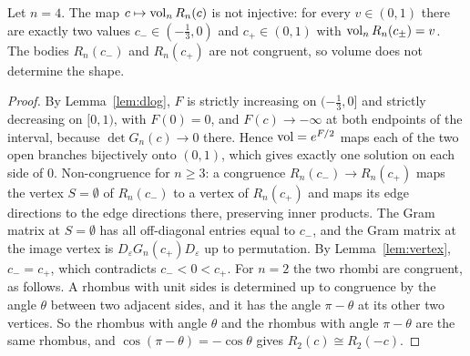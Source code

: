 \begin{theorem}\label{thm:main}
Let $n=4$. The map $c\mapsto\operatorname{vol}_nR_n(c)$ is not injective: for every $v\in(0,1)$ there are exactly two values $c_-\in(- \frac{1}{3},0)$ and $c_+\in(0,1)$ with $\operatorname{vol}_nR_n(c_\pm)=v$.
The bodies $R_n(c_-)$ and $R_n(c_+)$ are not congruent, so volume does not determine the shape.
\end{theorem}
\begin{proof}
By Lemma~\ref{lem:dlog}, $F$ is strictly increasing on $(- \frac{1}{3},0]$ and strictly decreasing on $[0,1)$, with $F(0)=0$, and $F(c)\to-\infty$ at both endpoints of the interval, because $\det G_n(c)\to0$ there.
Hence $\operatorname{vol}=e^{F/2}$ maps each of the two open branches bijectively onto $(0,1)$, which gives exactly one solution on each side of $0$.
Non-congruence for $n\ge3$: a congruence $R_n(c_-)\to R_n(c_+)$ maps the vertex $S=\emptyset$ of $R_n(c_-)$ to a vertex of $R_n(c_+)$ and maps its edge directions to the edge directions there, preserving inner products. The Gram matrix at $S=\emptyset$ has all off-diagonal entries equal to $c_-$, and the Gram matrix at the image vertex is $D_\varepsilon G_n(c_+)D_\varepsilon$ up to permutation. By Lemma~\ref{lem:vertex}, $c_-=c_+$, which contradicts $c_-<0<c_+$. For $n=2$ the two rhombi are congruent, as follows. A rhombus with unit sides is determined up to congruence by the angle $\theta$ between two adjacent sides, and it has the angle $\pi-\theta$ at its other two vertices. So the rhombus with angle $\theta$ and the rhombus with angle $\pi-\theta$ are the same rhombus, and $\cos(\pi-\theta)=-\cos\theta$ gives $R_2(c)\cong R_2(-c)$.
\end{proof}
